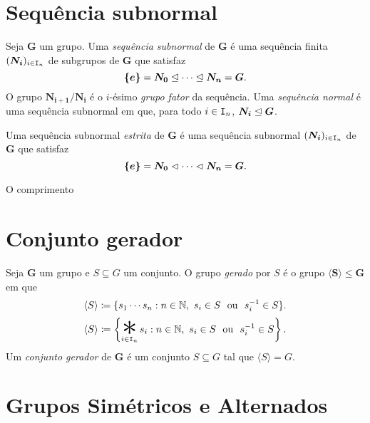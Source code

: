\section{Sequência subnormal}

\begin{defi}
Seja $\bm G$ um grupo. Uma \emph{sequência subnormal} de $\bm G$ é uma sequência finita $(\bm{N_i})_{i \in \mathtt I_n}$ de subgrupos de $\bm G$ que satisfaz
	\begin{equation*}
	\bm{\{e\}} = \bm{N_0} \mathrel{\unlhd} \cdots \mathrel{\unlhd} \bm{N_n} = \bm G.
	\end{equation*}
O grupo $\bm{N_{i+1}/N_i}$ é o $i$-ésimo \emph{grupo fator} da sequência.
Uma \emph{sequência normal} é uma sequência subnormal em que, para todo $i \in \mathtt I_n$, $\bm{N_i} \mathrel{\unlhd} \bm G$.

Uma sequência subnormal \emph{estrita} de $\bm G$ é uma sequência subnormal $(\bm{N_i})_{i \in \mathtt I_n}$ de $\bm G$ que satisfaz
	\begin{equation*}
	\bm{\{e\}} = \bm{N_0} \mathrel{\lhd} \cdots \mathrel{\lhd} \bm{N_n} = \bm G.
	\end{equation*}
	
O comprimento
\end{defi}



\section{Conjunto gerador}

\begin{defi}
Seja $\bm G$ um grupo e $S \subseteq G$ um conjunto. O grupo \emph{gerado} por $S$ é o grupo $\bm{\langle S \rangle} \leq \bm G$ em que
	\begin{equation*}
	\langle S \rangle \coloneqq \{s_1 \cdots s_n : n \in \N,\ s_i \in S \ou s_i\inv \in S\}.
	\end{equation*}
	\begin{equation*}
	\langle S \rangle \coloneqq \left\{\bigopb_{i \in \inte_n} s_i : n \in \N,\ s_i \in S \ou s_i\inv \in S\right\}.
	\end{equation*}
\noindent
Um \emph{conjunto gerador} de $\bm G$ é um conjunto $S \subseteq G$ tal que $\langle S \rangle = G$.
\end{defi}










\section{Grupos Simétricos e Alternados}


